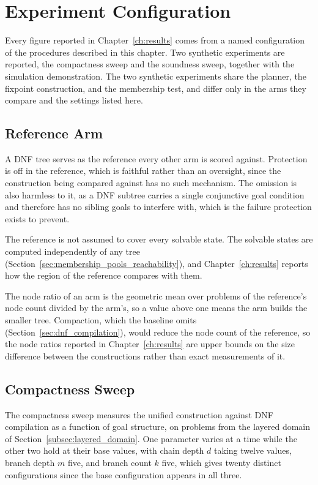 \section{Experiment Configuration}
\label{sec:configuration}
    Every figure reported in Chapter~\ref{ch:results} comes from a named configuration of the procedures described in this chapter.
    Two synthetic experiments are reported, the compactness sweep and the soundness sweep, together with the simulation demonstration.
    The two synthetic experiments share the planner, the fixpoint construction, and the membership test, and differ only in the arms they compare and the settings listed here.

    \subsection{Reference Arm}
    \label{subsec:reference_arm}
    A DNF tree serves as the reference every other arm is scored against.
    Protection is off in the reference, which is faithful rather than an oversight, since the construction being compared against has no such  mechanism.
    The omission is also harmless to it, as a DNF subtree carries a single conjunctive goal condition and therefore has no sibling goals to interfere with, which is the failure protection exists to prevent.
    
    The reference is not assumed to cover every solvable state.
    The solvable states are computed independently of any tree (Section~\ref{sec:membership_pools_reachability}), and Chapter~\ref{ch:results} reports how the region of the reference compares with them.

    The node ratio of an arm is the geometric mean over problems of the reference's node count divided by the arm's, so a value above one means the arm builds the smaller tree.
    Compaction, which the baseline omits (Section~\ref{sec:dnf_compilation}), would reduce the node count of the reference, so the node ratios reported in Chapter~\ref{ch:results} are upper bounds on the size difference between the constructions rather than exact measurements of it.

    \subsection{Compactness Sweep}
    \label{subsec:construction_comparison}
    The compactness sweep measures the unified construction against DNF compilation as a function of goal structure, on problems from the layered domain of Section~\ref{subsec:layered_domain}.
    One parameter varies at a time while the other two hold at their base values, with chain depth $d$ taking twelve values, branch depth $m$ five, and branch count $k$ five, which gives twenty distinct configurations since the base configuration appears in all three.


